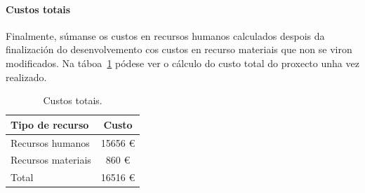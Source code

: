 \paragraph{Custos totais}
Finalmente, súmanse os custos en recursos humanos calculados despois da finalización do desenvolvemento cos custos en recurso materiais que non se viron modificados. Na táboa~\ref{tab:custoTotal} pódese ver o cálculo do custo total do proxecto unha vez realizado.

\begin{table} [tbh]
	\centering
	\begin{tabular}{|l|c|}
		\hline 
		\textbf{Tipo de recurso} & \textbf{Custo} \\ 
		\hline 
		Recursos humanos & 15656 € \\ 
		\hline 
		Recursos materiais & 860 € \\ 
		\hline 
		Total & 16516 € \\ 
		\hline 
	\end{tabular}
	\caption{Custos totais.}
	\label{tab:custoTotal}
\end{table}
